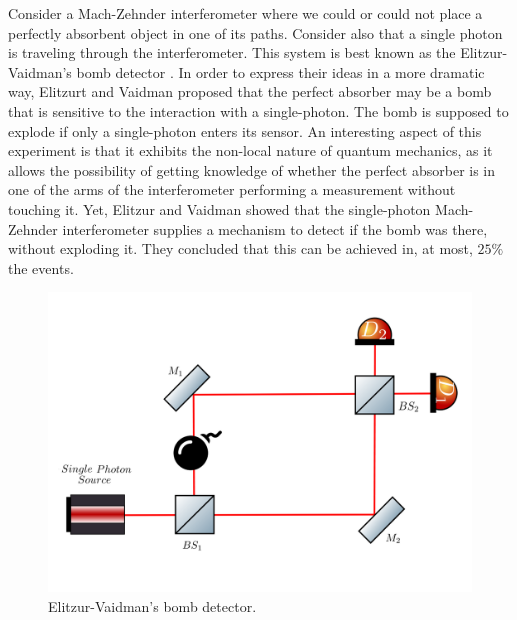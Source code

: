 \documentclass[12pt]{book}
\begin{document}
Consider a Mach-Zehnder interferometer where we could or could not place  a perfectly absorbent object in one of its paths. Consider also that a single photon is traveling through the interferometer. This system is best known as the Elitzur-Vaidman's bomb detector \cite{Elitzur}. In order to express their ideas in a more dramatic way, Elitzurt and Vaidman proposed that the perfect absorber may be a bomb that is sensitive to the interaction with a single-photon. The bomb is supposed to explode if only a single-photon enters its sensor. An interesting aspect of this experiment is that it exhibits the non-local nature of quantum mechanics, as it allows the possibility of getting knowledge of whether the perfect absorber is in one of the arms of the interferometer performing a measurement without touching it. Yet, Elitzur and Vaidman showed that the single-photon Mach-Zehnder interferometer supplies a mechanism to detect if the bomb was there, without exploding it. They concluded that this can be achieved in, at most, $25\%$ the events.


\begin{figure}[t!]
\centering
\includegraphics[width=\linewidth]{images/machzenhderbomb.png}
\caption{Elitzur-Vaidman's bomb detector.}
\label{fig:bomb}
\end{figure}
\end{document}
